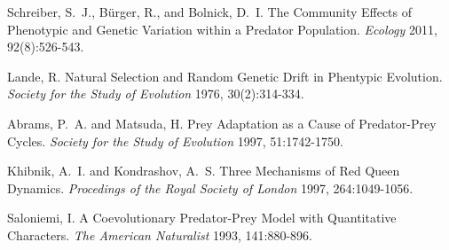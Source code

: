 \documentclass{amsart}
\theoremstyle{definition}
\theoremstyle{remark}
\numberwithin{equation}{section}
\begin{document}
\FloatBarrier
\pagebreak

\begin{thebibliography}{10}

Schreiber, S.~J., B\"urger,  R., and Bolnick,  D.~I.
The Community Effects of Phenotypic and Genetic Variation within a Predator Population.
\emph{Ecology}
2011,  92(8):526-543. 

Lande, R.
Natural Selection and Random Genetic Drift in Phentypic Evolution.
\emph{Society for the Study of Evolution}
1976, 30(2):314-334.

Abrams, P.~A. and Matsuda, H.
Prey Adaptation as a Cause of Predator-Prey Cycles.
\emph{Society for the Study of Evolution}
1997, 51:1742-1750.

Khibnik, A.~I. and Kondrashov, A.~S.
Three Mechanisms of Red Queen Dynamics.
\emph{Procedings of the Royal Society of London}
1997, 264:1049-1056.

Saloniemi, I.
A Coevolutionary Predator-Prey Model with Quantitative Characters.
\emph{The American Naturalist}
1993, 141:880-896.

\end{thebibliography}



\vfill


\end{document}
